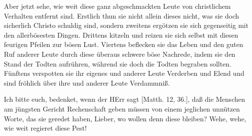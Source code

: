 Aber jetzt sehe, wie weit diese ganz abgeschmackten Leute von christlichem Verhalten entfernt sind. Erstlich thun sie nicht allein dieses nicht, was sie doch sicherlich Christo schuldig sind, sondern zweitens ergötzen sie sich gegenseitig mit den allerbösesten Dingen. Drittens kitzeln und reizen sie sich selbst mit diesen feurigen Pfeilen zur bösen Lust. Viertens beflecken sie das Leben und den guten Ruf anderer Leute durch diese überaus schwere böse Nachrede, indem sie den Stand der Todten aufrühren, während sie doch die Todten begraben sollten. Fünftens verspotten sie ihr eigenes und anderer Leute Verderben und Elend und sind fröhlich über ihre und anderer Leute Verdammniß.

Ich bitte euch, bedenket, wenn der HErr sagt [Matth. 12, 36.], daß die Menschen am jüngsten Gericht Rechenschaft geben müssen von einem jeglichen unnützen Worte, das sie geredet haben, Lieber, wo wollen denn diese bleiben? Wehe, wehe, wie weit regieret diese Pest!

